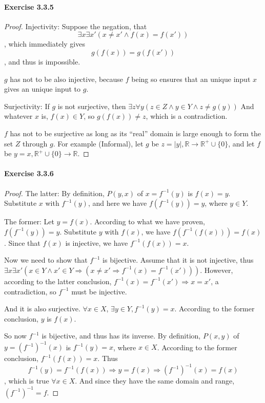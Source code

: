 \paragraph{Exercise 3.3.5} \label{exercise3.3.5}
\begin{proof}
Injectivity:
Suppose the negation, that 
\[
\exists x \exists x'(x \neq x' \wedge f(x) = f(x'))
\], which immediately gives 
\[
g(f(x)) = g(f(x'))
\], and thus is impossible.

$g$ has not to be also injective, because $f$ being so ensures that an unique input $x$ gives an unique 
input to $g$.

Surjectivity:
If $g$ is not surjective, then $\exists z \forall y(z \in Z \wedge y \in Y \wedge z \neq g(y))$
And whatever $x$ is, $f(x) \in Y$, so $g(f(x)) \neq z$, which is a contradiction.

$f$ has not to be surjective as long as its ``real'' domain is large enough to form the set $Z$ through 
$g$. For example (Informal), let $g$ be $z = |y|, \mathbb{R} \rightarrow \mathbb{R}^{+}\cup\{0\}$, and 
let $f$ be $y = x, \mathbb{R}^{+}\cup\{0\} \rightarrow \mathbb{R}$.
\end{proof}

\paragraph{Exercise 3.3.6} \label{exercise3.3.6}
\begin{proof}
The latter:
By definition, $P(y,x)$ of $x = f^{-1}(y)$ is $f(x)=y$. Substitute $x$ with $f^{-1}(y)$, and here we 
have $f(f^{-1}(y)) = y$, where $y \in Y$.

The former: Let $y = f(x)$. According to what we have proven, \\
$f(f^{-1}(y)) = y$. Substitute $y$ with 
$f(x)$, we have $f(f^{-1}(f(x))) = f(x)$. Since that $f(x)$ is injective, we have $f^{-1}(f(x)) = x$.

Now we need to show that $f^{-1}$ is bijective. Assume that it is not injective, thus 
$\exists x \exists x'(x \in Y \wedge x' \in Y \Longrightarrow(x\neq x' \Longrightarrow f^{-1}(x) = 
f^{-1}(x')))$.
However, according to the latter conclusion, $f^{-1}(x) = f^{-1}(x') \Longrightarrow x=x'$, a 
contradiction, so $f^{-1}$ must be injective.

And it is also surjective. $\forall x \in X$, $\exists y \in Y, f^{-1}(y)=x$. According to the former 
conclusion, $y$ is $f(x)$.

So now $f^{-1}$ is bijective, and thus has its inverse. By definition, $P(x,y)$ of 
$y = (f^{-1})^{-1}(x)$ is $f^{-1}(y) = x$, where $x \in X$. According to the former conclusion, 
$f^{-1}(f(x)) = x$. Thus
\[
f^{-1}(y) = f^{-1}(f(x)) \Longrightarrow y = f(x) \Longrightarrow (f^{-1})^{-1}(x) = f(x)
\], which is true $\forall x \in X$. And since they have the same domain and range, $(f^{-1})^{-1} = f$.
\end{proof}

